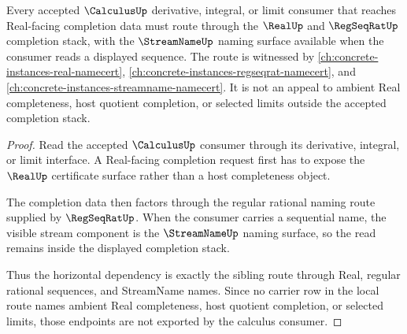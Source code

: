\begin{theorem}
\label{thm:calculus-real-completion-sibling-route}
Every accepted $\CalculusUp$ derivative, integral, or limit consumer that reaches Real-facing completion data must route through the $\RealUp$ and $\RegSeqRatUp$ completion stack, with the $\StreamNameUp$ naming surface available when the consumer reads a displayed sequence. The route is witnessed by \autoref{ch:concrete-instances-real-namecert}, \autoref{ch:concrete-instances-regseqrat-namecert}, and \autoref{ch:concrete-instances-streamname-namecert}. It is not an appeal to ambient Real completeness, host quotient completion, or selected limits outside the accepted completion stack.
\end{theorem}
\begin{proof}
Read the accepted $\CalculusUp$ consumer through its derivative, integral, or limit interface. A Real-facing completion request first has to expose the $\RealUp$ certificate surface rather than a host completeness object.

The completion data then factors through the regular rational naming route supplied by $\RegSeqRatUp$. When the consumer carries a sequential name, the visible stream component is the $\StreamNameUp$ naming surface, so the read remains inside the displayed completion stack.

Thus the horizontal dependency is exactly the sibling route through Real, regular rational sequences, and StreamName names. Since no carrier row in the local route names ambient Real completeness, host quotient completion, or selected limits, those endpoints are not exported by the calculus consumer.
\end{proof}

